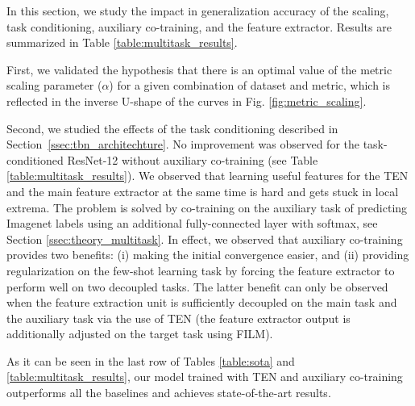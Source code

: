 \documentclass{article}
\begin{document}
In this section, we study the impact in generalization accuracy of the scaling, task conditioning, auxiliary co-training, and the feature extractor. Results are summarized in Table \ref{table:multitask_results}.

First, we validated the hypothesis that there is an optimal value of the metric scaling parameter ($\alpha$) for a given combination of dataset and metric, which is reflected in the inverse U-shape of the curves in Fig. \ref{fig:metric_scaling}.

Second, we studied the effects of the task conditioning described in Section~\ref{ssec:tbn_architechture}. No improvement was observed for the task-conditioned ResNet-12 without auxiliary co-training (see Table \ref{table:multitask_results}). We observed that learning useful features for the TEN and the main feature extractor at the same time is hard and gets stuck in local extrema. The problem is solved by co-training on the auxiliary task of predicting Imagenet labels using an additional fully-connected layer with softmax, see Section \ref{ssec:theory_multitask}. In effect, we observed that auxiliary co-training provides two benefits: (i) making the initial convergence easier, and (ii) providing regularization on the few-shot learning task by forcing the feature extractor to perform well on two decoupled tasks. The latter benefit can only be observed when the feature extraction unit is sufficiently decoupled on the main task and the auxiliary task via the use of TEN (the feature extractor output is additionally adjusted on the target task using FILM).

As it can be seen in the last row of Tables \ref{table:sota} and \ref{table:multitask_results}, our model trained with TEN and auxiliary co-training outperforms all the baselines and achieves state-of-the-art results.


\end{document}
